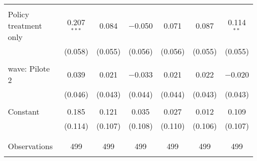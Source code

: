 \begin{tabular}{@{\extracolsep{5pt}}lcccccc}
  & & & & & & \\ 
 Policy treatment only & 0.207$^{***}$ & 0.084 & $-$0.050 & 0.071 & 0.087 & 0.114$^{**}$ \\ 
  & (0.058) & (0.055) & (0.056) & (0.056) & (0.055) & (0.055) \\ 
  & & & & & & \\ 
 wave: Pilote 2 & 0.039 & 0.021 & $-$0.033 & 0.021 & 0.022 & $-$0.020 \\ 
  & (0.046) & (0.043) & (0.044) & (0.044) & (0.043) & (0.043) \\ 
  & & & & & & \\ 
 Constant & 0.185 & 0.121 & 0.035 & 0.027 & 0.012 & 0.109 \\ 
  & (0.114) & (0.107) & (0.108) & (0.110) & (0.106) & (0.107) \\ 
  & & & & & & \\ 
\hline \\[-1.8ex] 

Observations & 499 & 499 & 499 & 499 & 499 & 499 \\ 
\hline 
\hline \\[-1.8ex] 
\end{tabular} 